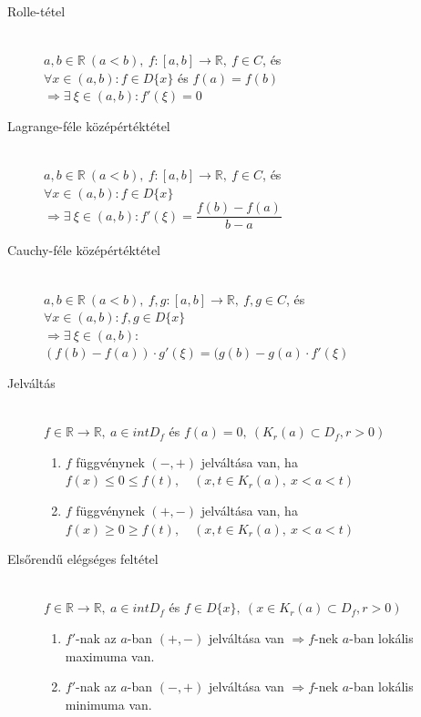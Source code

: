 \documentclass[margin=0px]{article}
\newcommand{\R}{\mathbb{R}}
\begin{document}
\begin{description}
    \item[Rolle-tétel] \hfill \\
        $ a,b \in \R \ (a<b), \ f:[a,b] \rightarrow \R, \ f\in C$, és \\
        $ \forall x\in (a,b) : f\in D\{x\} $ és $ f(a) = f(b) $ \\
        $ \Rightarrow \exists \ \xi \in (a,b) : f'(\xi) = 0 $
    \item[Lagrange-féle középértéktétel] \hfill \\
        $ a,b \in \R \ (a<b), \ f:[a,b] \rightarrow \R, \ f\in C$, és \\
        $ \forall x\in (a,b) : f\in D\{x\} $ \\
        $ \Rightarrow \exists \ \xi \in (a,b) : f'(\xi) = \dfrac{f(b)-f(a)}{b-a}  $
    \item[Cauchy-féle középértéktétel] \hfill \\
        $ a,b \in \R \ (a<b), \ f,g:[a,b] \rightarrow \R, \ f,g\in C$, és \\
        $ \forall x\in (a,b) : f,g\in D\{x\} $ \\
        $ \Rightarrow \exists \ \xi \in (a,b) :$ \\
        $ (f(b)-f(a))\cdot g'(\xi) = (g(b)-g(a)\cdot f'(\xi) $
\end{description}
\begin{description}
    \item[Jelváltás] \hfill \\
        $ f \in \R \rightarrow \R,\ a \in intD_f $ és $ f(a) = 0, \ ( K_r(a) \subset D_f, r > 0 ) $
        \begin{enumerate}
            \item $f$ függvénynek $ (-,+) $ jelváltása van, ha \\
                  $ f(x) \leq 0 \leq f(t), \quad (x,t \in K_r(a), \ x<a<t) $
            \item $f$ függvénynek $ (+,-) $ jelváltása van, ha \\
                  $ f(x) \geq 0 \geq f(t), \quad (x,t \in K_r(a), \ x<a<t) $
        \end{enumerate}
    \item[Elsőrendű elégséges feltétel] \hfill \\
        $ f \in \R \rightarrow \R, \ a \in intD_f $ és $ f\in D\{x\}, \ (x \in K_r(a) \subset D_f, r > 0 ) $
        \begin{enumerate}
            \item $f'$-nak az $a$-ban $(+,-)$ jelváltása van $\Rightarrow f$-nek $a$-ban lokális maximuma van.
            \item $f'$-nak az $a$-ban $(-,+)$ jelváltása van $\Rightarrow f$-nek $a$-ban lokális minimuma van.
        \end{enumerate}
\end{description}
\end{document}
